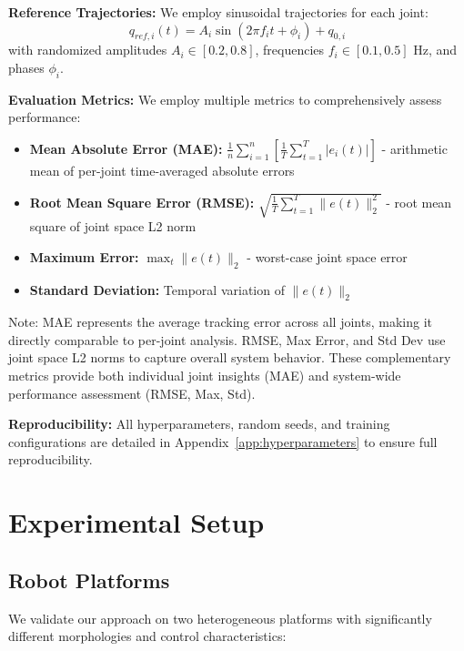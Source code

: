\documentclass[DTMColor]{ROB-New}
\begin{document}
\textbf{Reference Trajectories:} We employ sinusoidal trajectories for each joint:
\begin{equation}
    q_{ref,i}(t) = A_i \sin(2\pi f_i t + \phi_i) + q_{0,i}
\end{equation}
with randomized amplitudes $A_i \in [0.2, 0.8]$, frequencies $f_i \in [0.1, 0.5]$ Hz, and phases $\phi_i$.

\textbf{Evaluation Metrics:} We employ multiple metrics to comprehensively assess performance:

\begin{itemize}
    \item \textbf{Mean Absolute Error (MAE):} $\frac{1}{n}\sum_{i=1}^{n}\left[\frac{1}{T}\sum_{t=1}^{T}|e_i(t)|\right]$ - arithmetic mean of per-joint time-averaged absolute errors
    \item \textbf{Root Mean Square Error (RMSE):} $\sqrt{\frac{1}{T}\sum_{t=1}^{T}\|e(t)\|_2^2}$ - root mean square of joint space L2 norm
    \item \textbf{Maximum Error:} $\max_{t} \|e(t)\|_2$ - worst-case joint space error
    \item \textbf{Standard Deviation:} Temporal variation of $\|e(t)\|_2$
\end{itemize}

Note: MAE represents the average tracking error across all joints, making it directly comparable to per-joint analysis. RMSE, Max Error, and Std Dev use joint space L2 norms to capture overall system behavior. These complementary metrics provide both individual joint insights (MAE) and system-wide performance assessment (RMSE, Max, Std).

\textbf{Reproducibility:} All hyperparameters, random seeds, and training configurations are detailed in Appendix~\ref{app:hyperparameters} to ensure full reproducibility.

\section{Experimental Setup}
\label{sec:experiments}

\subsection{Robot Platforms}

We validate our approach on two heterogeneous platforms with significantly different morphologies and control characteristics:
\end{document}
